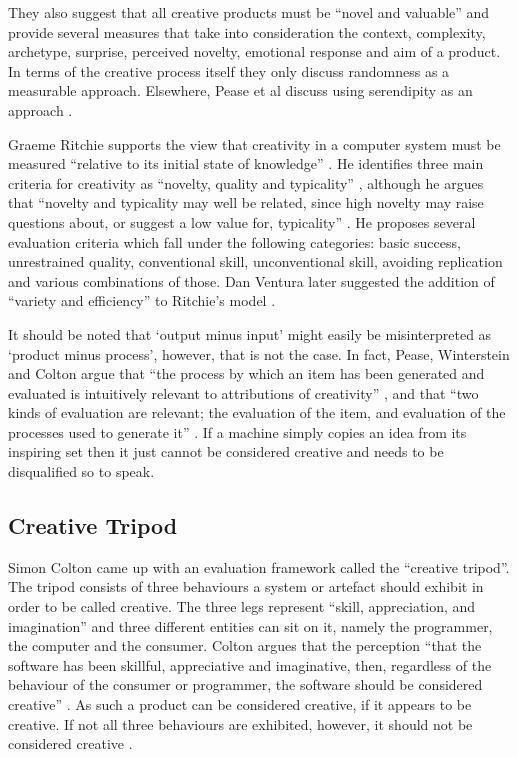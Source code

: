 They also suggest that all creative products must be ``novel and valuable'' \autocite[p.1]{Pease2001} and provide several measures that take into consideration the context, complexity, archetype, surprise, perceived novelty, emotional response and aim of a product. In terms of the creative process itself they only discuss randomness as a measurable approach. Elsewhere, Pease et al discuss using serendipity as an approach \citeyear{Pease2013}.

Graeme Ritchie supports the view that creativity in a computer system must be measured ``relative to its initial state of knowledge'' \citeyear[p.72]{Ritchie2007}. He identifies three main criteria for creativity as ``novelty, quality and typicality'' \citeyear[p.72-73]{Ritchie2007}, although he argues that ``novelty and typicality may well be related, since high novelty may raise questions about, or suggest a low value for, typicality'' \citeyear[p.73]{Ritchie2007} \citeyear[see also][]{Ritchie2001}. He proposes several evaluation criteria which fall under the following categories: \citeyear[p.91-92]{Ritchie2007} basic success, unrestrained quality, conventional skill, unconventional skill, avoiding replication and various combinations of those. Dan Ventura later suggested the addition of ``variety and efficiency'' to Ritchie's model \citeyear[p.7]{Ventura2008}.

It should be noted that `output minus input' might easily be misinterpreted as `product minus process', however, that is not the case. In fact, Pease, Winterstein and Colton argue that ``the process by which an item has been generated and evaluated is intuitively relevant to attributions of creativity'' \citeyear[p.6]{Pease2001}, and that ``two kinds of evaluation are relevant; the evaluation of the item, and evaluation of the processes used to generate it'' \citeyear[p.7]{Pease2001}. If a machine simply copies an idea from its inspiring set then it just cannot be considered creative and needs to be disqualified so to speak.


\subsection{Creative Tripod}

Simon Colton came up with an evaluation framework called the ``creative tripod''. The tripod consists of three behaviours a system or artefact should exhibit in order to be called creative. The three legs represent ``skill, appreciation, and imagination'' and three different entities can sit on it, namely the programmer, the computer and the consumer. Colton argues that the perception ``that the software has been skillful, appreciative and imaginative, then, regardless of the behaviour of the consumer or programmer, the software should be considered creative'' \citeyear{Colton2008a, Colton2008}. As such a product can be considered creative, if it appears to be creative. If not all three behaviours are exhibited, however, it should not be considered creative \autocite{Colton2008a, Colton2008}.

